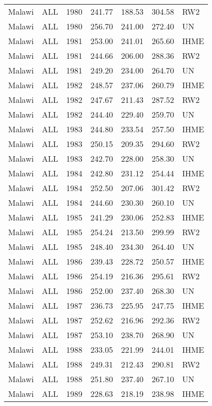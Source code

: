 \begin{longtable}{lllrrrl}
  Malawi & ALL & 1980 & 241.77 & 188.53 & 304.58 & RW2 \\ 
  Malawi & ALL & 1980 & 256.70 & 241.00 & 272.40 & UN \\ 
  Malawi & ALL & 1981 & 253.00 & 241.01 & 265.60 & IHME \\ 
  Malawi & ALL & 1981 & 244.66 & 206.00 & 288.36 & RW2 \\ 
  Malawi & ALL & 1981 & 249.20 & 234.00 & 264.70 & UN \\ 
  Malawi & ALL & 1982 & 248.57 & 237.06 & 260.79 & IHME \\ 
  Malawi & ALL & 1982 & 247.67 & 211.43 & 287.52 & RW2 \\ 
  Malawi & ALL & 1982 & 244.40 & 229.40 & 259.70 & UN \\ 
  Malawi & ALL & 1983 & 244.80 & 233.54 & 257.50 & IHME \\ 
  Malawi & ALL & 1983 & 250.15 & 209.35 & 294.60 & RW2 \\ 
  Malawi & ALL & 1983 & 242.70 & 228.00 & 258.30 & UN \\ 
  Malawi & ALL & 1984 & 242.80 & 231.12 & 254.44 & IHME \\ 
  Malawi & ALL & 1984 & 252.50 & 207.06 & 301.42 & RW2 \\ 
  Malawi & ALL & 1984 & 244.60 & 230.30 & 260.10 & UN \\ 
  Malawi & ALL & 1985 & 241.29 & 230.06 & 252.83 & IHME \\ 
  Malawi & ALL & 1985 & 254.24 & 213.50 & 299.99 & RW2 \\ 
  Malawi & ALL & 1985 & 248.40 & 234.30 & 264.40 & UN \\ 
  Malawi & ALL & 1986 & 239.43 & 228.72 & 250.57 & IHME \\ 
  Malawi & ALL & 1986 & 254.19 & 216.36 & 295.61 & RW2 \\ 
  Malawi & ALL & 1986 & 252.00 & 237.40 & 268.30 & UN \\ 
  Malawi & ALL & 1987 & 236.73 & 225.95 & 247.75 & IHME \\ 
  Malawi & ALL & 1987 & 252.62 & 216.96 & 292.36 & RW2 \\ 
  Malawi & ALL & 1987 & 253.10 & 238.70 & 268.90 & UN \\ 
  Malawi & ALL & 1988 & 233.05 & 221.99 & 244.01 & IHME \\ 
  Malawi & ALL & 1988 & 249.31 & 212.43 & 290.81 & RW2 \\ 
  Malawi & ALL & 1988 & 251.80 & 237.40 & 267.10 & UN \\ 
  Malawi & ALL & 1989 & 228.63 & 218.19 & 238.98 & IHME \\ 

\end{longtable}
